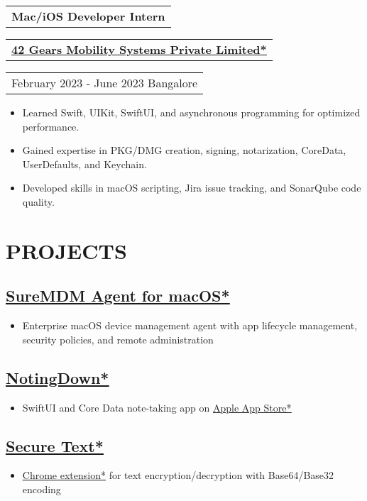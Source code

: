 \documentclass[11pt,a4paper]{moderncv}
\let\oldhref\href
\renewcommand{\href}[2]{\oldhref{#1}{\underline{#2}}}
\newcommand*{\experienceentry}[5][1.5mm]{
    \begin{tabularx}{\textwidth}{L}
        {\bfseries\large #2}
    \end{tabularx}
    \vspace{1mm}
    \begin{tabularx}{\textwidth}{L}
        {\bfseries #3}
    \end{tabularx}
    \vspace{1mm}
    \begin{tabularx}{\textwidth}{L}
        {\faCalendar\enspace #4 \faMapMarker\enspace #5}
    \end{tabularx}
    \par\addvspace{#1}
}
\begin{document}
\begin{minipage}[t]{0.62\textwidth}
\noindent\makebox[\linewidth]{\dotfill}
\vspace{2.0mm}

\experienceentry{Mac/iOS Developer Intern}{\href{https://www.42gears.com/}{42 Gears Mobility Systems Private Limited*}}{February 2023 - June 2023}{Bangalore}

\begin{itemize}
    \item Learned Swift, UIKit, SwiftUI, and asynchronous programming for optimized performance.
    \item Gained expertise in PKG/DMG creation, signing, notarization, CoreData, UserDefaults, and Keychain.
    \item Developed skills in macOS scripting, Jira issue tracking, and SonarQube code quality.
\end{itemize}

\section{PROJECTS}
\subsection{\href{https://www.42gears.com/products/mobile-device-management/suremdm-agent-for-macos-past-releases/}{SureMDM Agent for macOS*}}
\begin{itemize}
    \item Enterprise macOS device management agent with app lifecycle management, security policies, and remote administration
\end{itemize}

\subsection{\href{https://github.com/sachin6174/NotingDown}{NotingDown*}}
\begin{itemize}
    \item SwiftUI and Core Data note-taking app on \href{https://apps.apple.com/us/app/notingdown/id123456789}{Apple App Store*}
\end{itemize}

\subsection{\href{https://github.com/sachin6174/SecureText}{Secure Text*}}
\begin{itemize}
    \item \href{https://chrome.google.com/webstore/detail/secure-text/id123456789}{Chrome extension*} for text encryption/decryption with Base64/Base32 encoding
\end{itemize}


\end{minipage}
\end{document}
